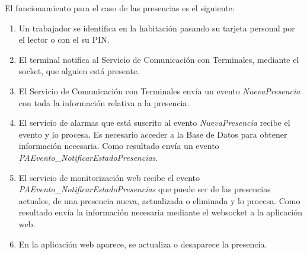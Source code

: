 El funcionamiento para el caso de las presencias es el siguiente:

\begin{enumerate}
	\item Un trabajador se identifica en la habitación pasando su tarjeta personal por el lector o con el su PIN.
	\item El terminal notifica al Servicio de Comunicación con Terminales, mediante el socket, que alguien está presente.
	\item El Servicio de Comunicación con Terminales envía un evento \textit{NuevaPresencia} con toda la información relativa a la presencia.
	\item El servicio de alarmas que está suscrito al evento \textit{NuevaPresencia} recibe el evento y lo procesa. Es necesario acceder a la Base de Datos para obtener información necesaria. Como resultado envía un evento \textit{PAEvento\_NotificarEstadoPresencias}.
	\item El servicio de monitorización web recibe el evento \textit{PAEvento\_NotificarEstadoPresencias} que puede ser de las presencias actuales, de una presencia nueva, actualizada o eliminada y lo procesa. Como resultado envía la información necesaria mediante el websocket a la aplicación web.
	\item En la aplicación web aparece, se actualiza o desaparece la presencia.
\end{enumerate}




